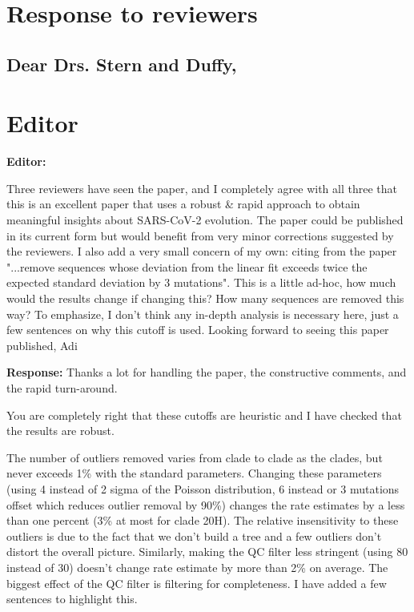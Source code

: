 \documentclass[aps,rmp,onecolumn]{revtex4-1}
\newcommand{\editor}[1]{\textbf{Editor:} #1\vskip 5mm}
\newcommand{\response}[1]{{\it {\color{response}\textbf{Response:} #1}}\vskip 5mm}
\begin{document}
\section*{Response to reviewers}

\subsection*{Dear Drs. Stern and Duffy,}

\section*{Editor}

\editor{

Three reviewers have seen the paper, and I completely agree with all three that this is an excellent paper that uses a robust & rapid approach to obtain meaningful insights about SARS-CoV-2 evolution. The paper could be published in its current form but would benefit from very minor corrections suggested by the reviewers.
I also add a very small concern of my own: citing from the paper "...remove sequences whose deviation from the linear fit exceeds twice the expected standard deviation by 3 mutations". This is a little ad-hoc, how much would the results change if changing this? How many sequences are removed this way? To emphasize, I don't think any in-depth analysis is necessary here, just a few sentences on why this cutoff is used.
Looking forward to seeing this paper published,
Adi
}

\response{Thanks a lot for handling the paper, the constructive comments, and the rapid turn-around.

You are completely right that these cutoffs are heuristic and I have checked that the results are robust.

The number of outliers removed varies from clade to clade as the clades, but never exceeds 1\% with the standard parameters.
Changing these parameters (using 4 instead of 2 sigma of the Poisson distribution, 6 instead or 3 mutations offset which reduces outlier removal by 90\%) changes the rate estimates by a less than one percent (3\% at most for clade 20H).
The relative insensitivity to these outliers is due to the fact that we don't build a tree and a few outliers don't distort the overall picture.
Similarly, making the QC filter less stringent (using 80 instead of 30) doesn't change rate estimate by more than 2\% on average. The biggest effect of the QC filter is filtering for completeness.
I have added a few sentences to highlight this.

}
\end{document}
